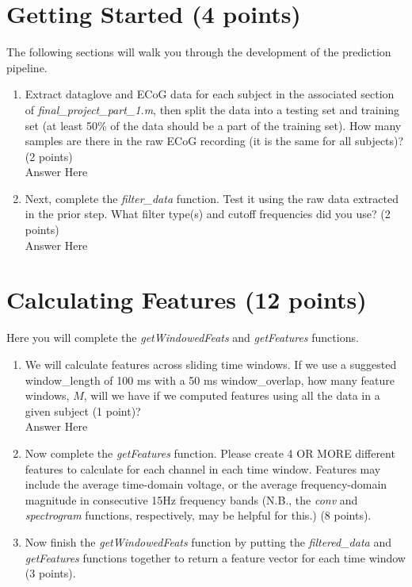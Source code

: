 \documentclass{article}
\begin{document}
\section{Getting Started (4 points)}
The following sections will walk you through the development of the prediction pipeline. 

\begin{enumerate}
    \item  Extract dataglove and ECoG data for each subject in the associated section of \emph{final\_project\_part\_1.m}, then split the data into a testing set and training set (at least 50\% of the data should be a part of the training set). How many samples are there in the raw ECoG recording (it is the same for all subjects)? (2 points)\\
    Answer Here
    \item Next, complete the \emph{filter\_data} function. Test it using the raw data extracted in the prior step. What filter type(s) and cutoff frequencies did you use? (2 points)\\
    Answer Here
\end{enumerate}

\section{Calculating Features (12 points)}
Here you will complete the \emph{getWindowedFeats} and \emph{getFeatures} functions. 
\begin{enumerate}
    \item We will calculate features across sliding time windows. If we use a suggested window\_length of 100 ms with a 50 ms window\_overlap, how many feature windows, $M$, will we have if we computed features using all the data in a given subject (1 point)?\\
    Answer Here 
    \item Now complete the \emph{getFeatures} function. Please create 4 OR MORE different features to calculate for each channel in each time window. Features may include the average time-domain voltage, or the average frequency-domain magnitude in consecutive 15Hz frequency bands (N.B., the \emph{conv} and \emph{spectrogram} functions, respectively, may be helpful for this.) (8 points).
    \item Now finish the \emph{getWindowedFeats} function by putting the \emph{filtered\_data} and \emph{getFeatures} functions together to return a feature vector for each time window (3 points).
\end{enumerate}
\end{document}
